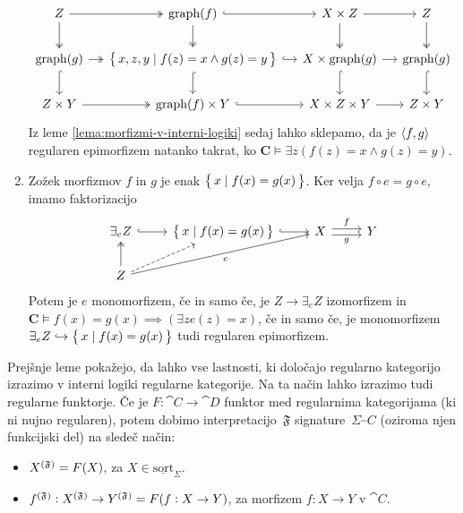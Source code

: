 \documentclass[../kategoricna_logika.tex]{subfiles}
\begin{document}
\begin{dokaz}
\begin{enumerate}[label=(\roman*)]
\begin{equation*}
\begin{tikzcd}[column sep=small]
          Z \ar[d, two heads] \ar[r, two heads] & \mathrm{graph}(f) \ar[d, two heads] \ar[r, hook] &
          X \times Z \ar[d, two heads] \ar[r] & Z \ar[d, two heads] \\
          \mathrm{graph}(g) \ar[d, hook] \ar[r, two heads] &
          \set{x,z,y \mid f(z) = x \land g(z) = y} \ar[d, hook] \ar[r, hook] &
          X \times \mathrm{graph}(g) \ar[d, hook] \ar[r] &
          \mathrm{graph}(g) \ar[d, hook] \\
          Z \times Y \ar[r, two heads] & \mathrm{graph}(f) \times Y \ar[r, hook] &
          X \times Z \times Y \ar[r] & Z \times Y
        \end{tikzcd}
      \end{equation*}
      Iz leme \ref{lema:morfizmi-v-interni-logiki} sedaj lahko sklepamo,
      da je $\fprod{f,g}$ regularen epimorfizem natanko takrat,
      ko $\mathbf{C} \models \exists z (f(z) = x \land g(z) = y)$.
      
    \item Zožek morfizmov $f$ in $g$ je enak $\set{x \mid f(x) = g(x)}$.
      Ker velja $f \circ e = g \circ e$, imamo faktorizacijo
      \begin{equation*}
        \begin{tikzcd}
          \exists_{e}Z \ar[r, hook] & \set{x \mid f(x) = g(x)} \ar[r, hook] &
          X \ar[r, shift left, "f"] \ar[r, shift right, "g"'] & Y \\
          Z \ar[u, two heads] \ar[ur, dashed] \ar[urr, "e"']
        \end{tikzcd}
      \end{equation*}
      Potem je $e$ monomorfizem, če in samo če, je $Z \to \exists_{e}Z$ izomorfizem in
      $\mathbf{C} \models f(x) = g(x) \implies (\exists z e(z) = x)$, če in samo če,
      je monomorfizem $\exists_{e}Z \hookrightarrow \set{x \mid f(x) = g(x)}$
      tudi regularen epimorfizem.
  \end{enumerate}
\end{dokaz}%
Prejšnje leme pokažejo, da lahko vse lastnosti,
ki določajo regularno kategorijo izrazimo v interni logiki regularne kategorije.
Na ta način lahko izrazimo tudi regularne funktorje.
Če je $F : \cat{C} \to \cat{D}$ funktor med regularnima kategorijama (ki ni nujno regularen),
potem dobimo interpretacijo~$\mathfrak{F}$ signature~$\Sigma_\cat{C}$ (oziroma njen funkcijski del) na sledeč način:
\begin{itemize}
  \item $\interp[\mathfrak{F}]{X} = F(X)$, za $X \in \underline{\mathrm{sort}}_{\Sigma}$.
  \item $\interp[\mathfrak{F}]{f} : \interp[\mathfrak{F}]{X} \to \interp[\mathfrak{F}]{Y} = F(f : X \to Y)$, za morfizem $f: X \to Y$ v $\cat{C}$.
\end{itemize}
\end{document}
